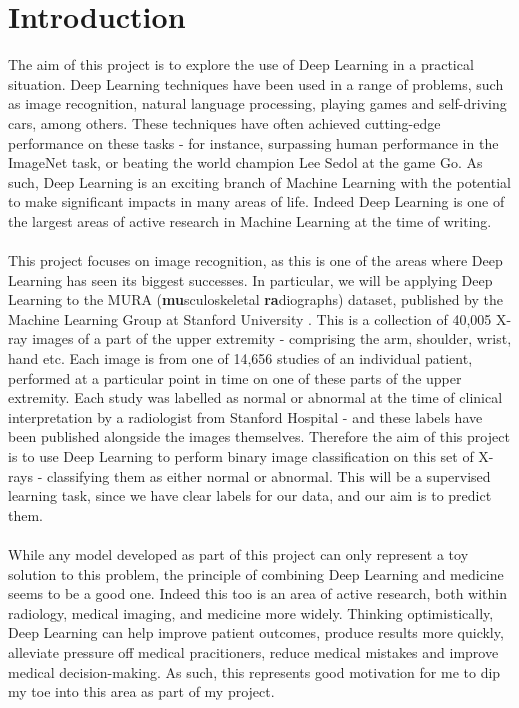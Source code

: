 \documentclass[11pt]{article} %
\theoremstyle{plain}
\theoremstyle{definition}
\begin{document}
\section{Introduction}
The aim of this project is to explore the use of Deep Learning in a practical situation. Deep Learning techniques have been used in a range of problems, such as image recognition, natural language processing, playing games and self-driving cars, among others. These techniques have often achieved cutting-edge performance on these tasks - for instance, surpassing human performance in the ImageNet task, or beating the world champion Lee Sedol at the game Go. As such, Deep Learning is an exciting branch of Machine Learning with the potential to make significant impacts in many areas of life. Indeed Deep Learning is one of the largest areas of active research in Machine Learning at the time of writing.
\\
\\
\noindent
This project focuses on image recognition, as this is one of the areas where Deep Learning has seen its biggest successes. In particular, we will be applying Deep Learning to the MURA (\textbf{mu}sculoskeletal \textbf{ra}diographs) dataset, published by the Machine Learning Group at Stanford University \cite{MURA2017}. This is a collection of 40,005 X-ray images of a part of the upper extremity - comprising the arm, shoulder, wrist, hand etc. Each image is from one of 14,656 studies of an individual patient, performed at a particular point in time on one of these parts of the upper extremity. Each study was labelled as normal or abnormal at the time of clinical interpretation by a radiologist from Stanford Hospital - and these labels have been published alongside the images themselves. Therefore the aim of this project is to use Deep Learning to perform binary image classification on this set of X-rays - classifying them as either normal or abnormal. This will be a supervised learning task, since we have clear labels for our data, and our aim is to predict them. 
\\
\\
\noindent
While any model developed as part of this project can only represent a toy solution to this problem, the principle of combining Deep Learning and medicine seems to be a good one. Indeed this too is an area of active research, both within radiology, medical imaging, and medicine more widely. Thinking optimistically, Deep Learning can help improve patient outcomes, produce results more quickly, alleviate pressure off medical pracitioners, reduce medical mistakes and improve medical decision-making. As such, this represents good motivation for me to dip my toe into this area as part of my project.
\end{document}
